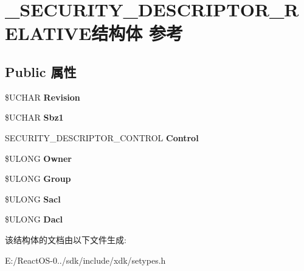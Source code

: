 \hypertarget{struct___s_e_c_u_r_i_t_y___d_e_s_c_r_i_p_t_o_r___r_e_l_a_t_i_v_e}{}\section{\+\_\+\+S\+E\+C\+U\+R\+I\+T\+Y\+\_\+\+D\+E\+S\+C\+R\+I\+P\+T\+O\+R\+\_\+\+R\+E\+L\+A\+T\+I\+V\+E结构体 参考}
\label{struct___s_e_c_u_r_i_t_y___d_e_s_c_r_i_p_t_o_r___r_e_l_a_t_i_v_e}
\subsection*{Public 属性}
\begin{DoxyCompactItemize}
\item 
\mbox{\label{struct___s_e_c_u_r_i_t_y___d_e_s_c_r_i_p_t_o_r___r_e_l_a_t_i_v_e_ac014eab80db670a43f0ada7023dfdab3}} 
\$U\+C\+H\+AR {\bfseries Revision}
\item 
\mbox{\label{struct___s_e_c_u_r_i_t_y___d_e_s_c_r_i_p_t_o_r___r_e_l_a_t_i_v_e_ae83977d15c3d4b7e4d5477699b2f52ab}} 
\$U\+C\+H\+AR {\bfseries Sbz1}
\item 
\mbox{\label{struct___s_e_c_u_r_i_t_y___d_e_s_c_r_i_p_t_o_r___r_e_l_a_t_i_v_e_a084c1aff512c7521374babc4823b237e}} 
S\+E\+C\+U\+R\+I\+T\+Y\+\_\+\+D\+E\+S\+C\+R\+I\+P\+T\+O\+R\+\_\+\+C\+O\+N\+T\+R\+OL {\bfseries Control}
\item 
\mbox{\label{struct___s_e_c_u_r_i_t_y___d_e_s_c_r_i_p_t_o_r___r_e_l_a_t_i_v_e_a70bbf8891b9e8ded780ed0ce49d9c7ae}} 
\$U\+L\+O\+NG {\bfseries Owner}
\item 
\mbox{\label{struct___s_e_c_u_r_i_t_y___d_e_s_c_r_i_p_t_o_r___r_e_l_a_t_i_v_e_a265ecbec76ef25004e7bd80cf16fe5de}} 
\$U\+L\+O\+NG {\bfseries Group}
\item 
\mbox{\label{struct___s_e_c_u_r_i_t_y___d_e_s_c_r_i_p_t_o_r___r_e_l_a_t_i_v_e_a6e0ab1b2cf5a2f8f2489dfc3e9cedfa1}} 
\$U\+L\+O\+NG {\bfseries Sacl}
\item 
\mbox{\label{struct___s_e_c_u_r_i_t_y___d_e_s_c_r_i_p_t_o_r___r_e_l_a_t_i_v_e_ab219595ce08f70582fa704183edd4641}} 
\$U\+L\+O\+NG {\bfseries Dacl}
\end{DoxyCompactItemize}


该结构体的文档由以下文件生成\+:\begin{DoxyCompactItemize}
\item 
E\+:/\+React\+O\+S-\/0../sdk/include/xdk/setypes.\+h\end{DoxyCompactItemize}
